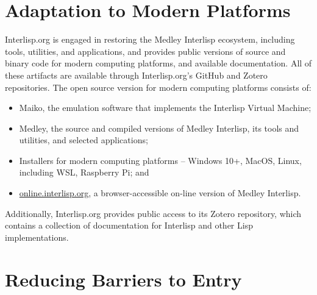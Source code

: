 \documentclass[sigconf]{acmart}
\begin{document}




\section{Adaptation to Modern Platforms}

Interlisp.org is engaged in restoring the Medley Interlisp ecosystem, including tools, utilities, and applications, and provides public versions of source and binary code for modern computing platforms, and available documentation. All of these artifacts are available through Interlisp.org's GitHub and Zotero repositories. The open source version for modern computing platforms consists of:

\begin{itemize}
  \item Maiko, the emulation software that implements the Interlisp Virtual Machine;

  \item Medley, the source and compiled versions of Medley Interlisp, its tools and utilities, and selected applications; 

  \item Installers for modern computing platforms – Windows 10+, MacOS, Linux, including WSL, Raspberry Pi; and

  \item \url{online.interlisp.org}, a browser-accessible on-line version of Medley Interlisp.
\end{itemize}

Additionally, Interlisp.org provides public access to its Zotero repository, which contains a collection of documentation for Interlisp and other Lisp implementations.

\section{Reducing Barriers to Entry}
\end{document}

